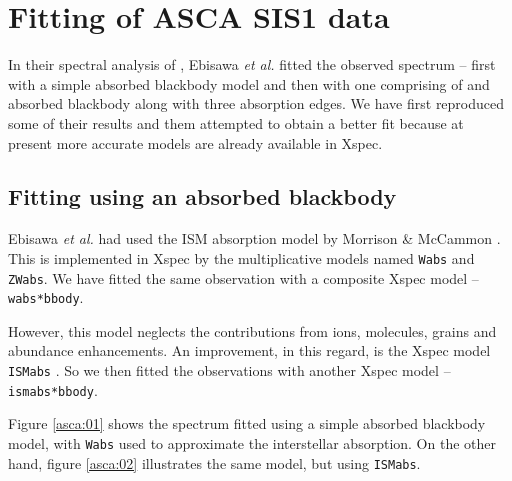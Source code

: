		\section{Fitting of ASCA SIS1 data} \label{continuum:asca}
			In their spectral analysis of \mrvel, Ebisawa \emph{et al.} fitted the observed spectrum -- first with a simple absorbed blackbody model and then with one comprising of and absorbed blackbody along with three absorption edges. We have first reproduced some of their results and them attempted to obtain a better fit because at present more accurate models are already available in Xspec.
			
			\subsection{Fitting using an absorbed blackbody} \label{continuum:asca:abs-bb}
				Ebisawa \emph{et al.} had used the ISM absorption model by Morrison \& McCammon \cite{morrison1983wabs}. This is implemented in Xspec by the multiplicative models named \texttt{Wabs} and \texttt{ZWabs}. We have fitted the same observation with a composite Xspec model -- \texttt{wabs*bbody}.
				
				However, this model neglects the contributions from ions, molecules, grains and abundance enhancements. An improvement, in this regard, is the Xspec model \texttt{ISMabs} \cite{ismabs_gatuzz}. So we then fitted the observations with another Xspec model -- \texttt{ismabs*bbody}.
				
				Figure \ref{asca:01} shows the spectrum fitted using a simple absorbed blackbody model, with \texttt{Wabs} used to approximate the interstellar absorption. On the other hand, figure \ref{asca:02} illustrates the same model, but using \texttt{ISMabs}.
				
